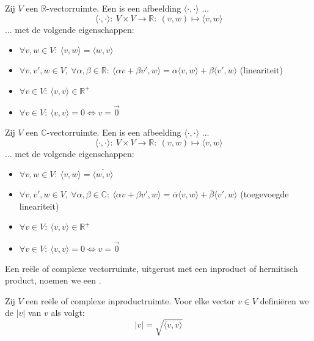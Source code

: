 \documentclass[main.tex]{subfiles}
\begin{document}
\begin{de}
  Zij $V$ een $\mathbb{R}$-vectorruimte.
  Een  is een afbeelding $\langle \cdot, \cdot\rangle$ ...
  \[ \langle \cdot , \cdot \rangle :\ V \times V \rightarrow \mathbb{R}:\ (v,w) \mapsto \langle v, w \rangle \]
  ... met de volgende eigenschappen: 
  \begin{itemize}
  \item $\forall v, w \in V:\ \langle v,w \rangle = \langle w, v \rangle$
  \item $\forall v,v',w \in V,\ \forall \alpha,\beta \in \mathbb{R}:\ \langle \alpha v + \beta v', w \rangle = \alpha \langle v,w \rangle + \beta \langle v', w \rangle $ (lineariteit)
  \item $\forall v\in V:\ \langle v,v \rangle \in \mathbb{R}^{+}$
  \item $\forall v\in V:\ \langle v,v \rangle = 0 \Leftrightarrow v = \vec{0}$
  \end{itemize}
\end{de}

\begin{de}
  Zij $V$ een $\mathbb{C}$-vectorruimte.
  Een  is een afbeelding $\langle \cdot, \cdot\rangle$ ...
  \[ \langle \cdot , \cdot \rangle :\ V \times V \rightarrow \mathbb{R}:\ (v,w) \mapsto \langle v, w \rangle \]
  ... met de volgende eigenschappen:
  \begin{itemize}
  \item $\forall v, w \in V:\ \langle v,w \rangle = \overline{\langle w, v \rangle}$
  \item $\forall v,v',w \in V,\ \forall \alpha,\beta \in \mathbb{C}:\ \langle \alpha v + \beta v', w \rangle = \overline{\alpha} \langle v,w \rangle + \overline{\beta} \langle v', w \rangle $ (toegevoegde lineariteit)
  \item $\forall v\in V:\ \langle v,v \rangle \in \mathbb{R}^{+}$
  \item $\forall v\in V:\ \langle v,v \rangle = 0 \Leftrightarrow v = \vec{0}$
  \end{itemize}
\end{de}

\begin{de}
  Een re\"ele of complexe vectorruimte, uitgerust met een inproduct of hermitisch product, noemen we een .
\end{de}

\begin{de}
  Zij $V$ een re\"ele of complexe inproductruimte.
  Voor elke vector $v\in V$ defini\"eren we de  $|v|$ van $v$ als volgt:
  \[ |v| = \sqrt{\langle v,v\rangle} \]
\end{de}
\end{document}
